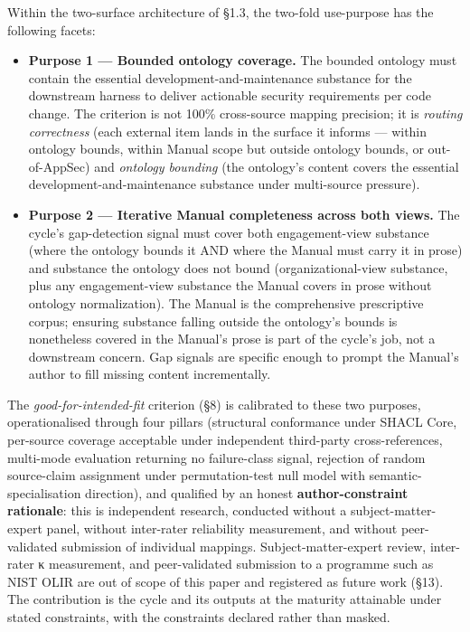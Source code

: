 \documentclass[
]{article}
\providecommand{\tightlist}{%
  \setlength{\itemsep}{0pt}\setlength{\parskip}{0pt}}
\begin{document}
Within the two-surface architecture of §1.3, the two-fold use-purpose
has the following facets:

\begin{itemize}
\tightlist
\item
  \textbf{Purpose 1 --- Bounded ontology coverage.} The bounded ontology
  must contain the essential development-and-maintenance substance for
  the downstream harness to deliver actionable security requirements per
  code change. The criterion is not 100\% cross-source mapping
  precision; it is \emph{routing correctness} (each external item lands
  in the surface it informs --- within ontology bounds, within Manual
  scope but outside ontology bounds, or out-of-AppSec) and
  \emph{ontology bounding} (the ontology's content covers the essential
  development-and-maintenance substance under multi-source pressure).
\item
  \textbf{Purpose 2 --- Iterative Manual completeness across both
  views.} The cycle's gap-detection signal must cover both
  engagement-view substance (where the ontology bounds it AND where the
  Manual must carry it in prose) and substance the ontology does not
  bound (organizational-view substance, plus any engagement-view
  substance the Manual covers in prose without ontology normalization).
  The Manual is the comprehensive prescriptive corpus; ensuring
  substance falling outside the ontology's bounds is nonetheless covered
  in the Manual's prose is part of the cycle's job, not a downstream
  concern. Gap signals are specific enough to prompt the Manual's author
  to fill missing content incrementally.
\end{itemize}

The \emph{good-for-intended-fit} criterion (§8) is calibrated to these
two purposes, operationalised through four pillars (structural
conformance under SHACL Core, per-source coverage acceptable under
independent third-party cross-references, multi-mode evaluation
returning no failure-class signal, rejection of random source-claim
assignment under permutation-test null model with
semantic-specialisation direction), and qualified by an honest
\textbf{author-constraint rationale}: this is independent research,
conducted without a subject-matter-expert panel, without inter-rater
reliability measurement, and without peer-validated submission of
individual mappings. Subject-matter-expert review, inter-rater κ
measurement, and peer-validated submission to a programme such as NIST
OLIR are out of scope of this paper and registered as future work (§13).
The contribution is the cycle and its outputs at the maturity attainable
under stated constraints, with the constraints declared rather than
masked.
\end{document}
